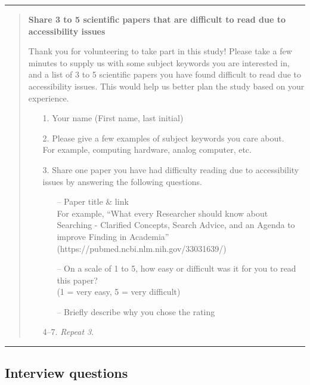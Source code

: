 \begin{center}
\noindent \rule{0.9\linewidth}{0.4pt}
\end{center}
\begin{quote}
\textbf{Share 3 to 5 scientific papers that are difficult to read due to accessibility issues}

\vspace{4pt}\noindent Thank you for volunteering to take part in this study! Please take a few minutes to supply us with some subject keywords you are interested in, and a list of 3 to 5 scientific papers you have found difficult to read due to accessibility issues. This would help us better plan the study based on your experience.

\vspace{4pt}
\begin{enumerate}
    \item[1.] Your name (First name, last initial)
    \item[2.] Please give a few examples of subject keywords you care about. \\ \small For example, computing hardware, analog computer, etc. \normalsize
    \item[3.] Share one paper you have had difficulty reading due to accessibility issues by answering the following questions.
    \begin{itemize}
        \item[--] Paper title \& link \\ \small For example, ``What every Researcher should know about Searching - Clarified Concepts, Search Advice, and an Agenda to improve Finding in Academia'' (https://pubmed.ncbi.nlm.nih.gov/33031639/) \normalsize
        \item[--] On a scale of 1 to 5, how easy or difficult was it for you to read this paper? \\ \small (1 = very easy, 5 = very difficult) \normalsize
        \item[--] Briefly describe why you chose the rating
    \end{itemize}
    \item[4--7.] \textit{Repeat 3}.
\end{enumerate}
\end{quote}
\begin{center}
\noindent \rule{0.9\linewidth}{0.4pt}
\end{center}

\subsection{Interview questions}
\label{app:interview_questions}

